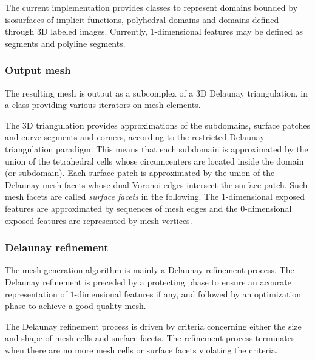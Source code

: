The current implementation provides  classes to represent
domains bounded by isosurfaces of implicit functions, polyhedral domains
and domains defined through 3D labeled images. 
Currently,  $1$-dimensional features may be defined as segments and polyline segments.


\subsubsection{Output mesh}

The resulting mesh is output as a subcomplex of a 3D Delaunay triangulation,
in a class  providing various iterators
on mesh elements.

 The 3D triangulation provides approximations of the
subdomains, surface patches and curve segments
and corners, according to the restricted
Delaunay triangulation paradigm. This means that each subdomain
 is approximated by the union of  the tetrahedral cells
 whose circumcenters are located inside the domain
(or subdomain). 
Each surface patch  is approximated 
by the union of   the Delaunay mesh  facets whose dual Voronoi edges intersect the surface patch.
Such mesh  facets are called {\em surface facets}  in the following. 
The $1$-dimensional exposed features are approximated by  sequences of  mesh edges
and  the $0$-dimensional exposed features are represented by mesh vertices.



\subsubsection{Delaunay refinement}
\label{introsec:param}

The mesh generation algorithm is  mainly a Delaunay refinement process.
The Delaunay refinement is 
preceded by a protecting phase to ensure an accurate representation
of $1$-dimensional features if any,
and  followed by an optimization  phase to achieve a good quality mesh.

The   Delaunay refinement process is driven by criteria
concerning either the size and shape of  mesh cells 
and surface facets.
The refinement process terminates when there are
no more mesh cells or  surface facets violating the  criteria.


